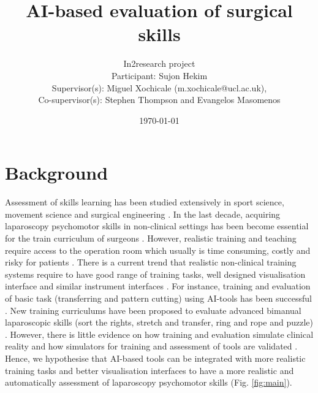 \documentclass[11pt]{article}
\title{
AI-based evaluation of surgical skills%
}
\author{
In2research project\\ 
Participant: Sujon Hekim\\
Supervisor(s): Miguel Xochicale (m.xochicale@ucl.ac.uk), \\
Co-supervisor(s): {Stephen Thompson and Evangelos Masomenos}
}
\date{\today}
\begin{document}
\maketitle
\thispagestyle{empty} %


\section{Background}
Assessment of skills learning has been studied extensively in sport science, movement science and surgical engineering \cite{XochicalePhDThesis2019}.
In the last decade, acquiring laparoscopy psychomotor skills in non-clinical settings has been become essential for the train curriculum of surgeons \cite{OVERTOOM2019242}.
However, realistic training and teaching require access to the operation room which usually is time consuming, costly and risky for patients \cite{vanGinkel2020}.
There is a current trend that realistic non-clinical training systems require to have good range of training tasks, well designed visualisation interface and similar instrument interfaces \cite{Hong2021}.
For instance, training and evaluation of basic task (transferring and pattern cutting) using AI-tools has been successful \cite{alsonso-silverio2018}.
New training curriculums have been proposed to evaluate advanced bimanual laparoscopic skills (sort the rights, stretch and transfer, ring and rope and puzzle) \cite{vanGinkel2020}.
However, there is little evidence on how training and evaluation simulate clinical reality \cite{ziane-casenave2022} and how simulators for training and assessment of tools are validated \cite{Toale2022-sep}. 
Hence, we hypothesise that AI-based tools can be integrated with more realistic training tasks and better visualisation interfaces to have a more realistic and automatically assessment of laparoscopy psychomotor skills (Fig. \ref{fig:main}).
\end{document}

